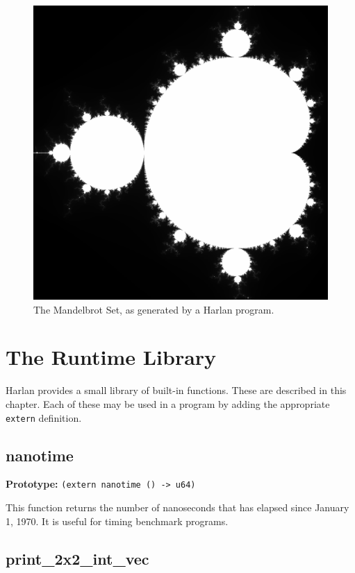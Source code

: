 \documentclass[oneside]{report}
\begin{document}
\begin{figure}
  \centering
  \includegraphics[width=\textwidth]{figures/mandelbrot.eps}
  \caption{The Mandelbrot Set, as generated by a Harlan program.}
  \label{fig:mandelbrot}
\end{figure}

\chapter{The Runtime Library}

Harlan provides a small library of built-in functions. These are
described in this chapter. Each of these may be used in a program by
adding the appropriate \lstinline{extern} definition.

\section{nanotime}

\textbf{Prototype:} \lstinline{(extern nanotime () -> u64)}

This function returns the number of nanoseconds that has elapsed since
January 1, 1970. It is useful for timing benchmark programs.

\section{print\_2x2\_int\_vec}
\end{document}
